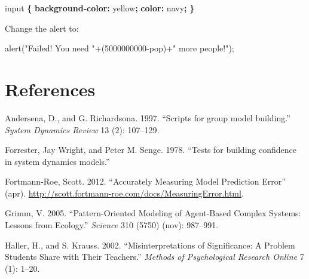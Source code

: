 \documentclass[]{memoir}
\newenvironment{Shaded}{}{}
\newcommand{\KeywordTok}[1]{\textcolor[rgb]{0.00,0.44,0.13}{\textbf{{#1}}}}
\newcommand{\DataTypeTok}[1]{\textcolor[rgb]{0.56,0.13,0.00}{{#1}}}
\newcommand{\DecValTok}[1]{\textcolor[rgb]{0.25,0.63,0.44}{{#1}}}
\newcommand{\StringTok}[1]{\textcolor[rgb]{0.25,0.44,0.63}{{#1}}}
\newcommand{\FunctionTok}[1]{\textcolor[rgb]{0.02,0.16,0.49}{{#1}}}
\newcommand{\NormalTok}[1]{{#1}}
\begin{document}

\begin{Shaded}
\begin{Highlighting}[]
\NormalTok{input }\KeywordTok{\{}
    \KeywordTok{background-color:} \DataTypeTok{yellow}\KeywordTok{;}
    \KeywordTok{color:} \DataTypeTok{navy}\KeywordTok{;}
\KeywordTok{\}}
\end{Highlighting}
\end{Shaded}


Change the alert to:

\begin{Shaded}
\begin{Highlighting}[]
\FunctionTok{alert}\NormalTok{(}\StringTok{"Failed! You need "}\NormalTok{+(}\DecValTok{5000000000}\NormalTok{-pop)+}\StringTok{" more people!"}\NormalTok{);}
\end{Highlighting}
\end{Shaded}

\chapter{References}

Andersena, D., and G. Richardsona. 1997. ``Scripts for group model
building.'' \emph{System Dynamics Review} 13 (2): 107--129.

Forrester, Jay Wright, and Peter M. Senge. 1978. ``Tests for building
confidence in system dynamics models.''

Fortmann-Roe, Scott. 2012. ``Accurately Measuring Model Prediction
Error'' (apr).
\url{http://scott.fortmann-roe.com/docs/MeasuringError.html}.

Grimm, V. 2005. ``Pattern-Oriented Modeling of Agent-Based Complex
Systems: Lessons from Ecology.'' \emph{Science} 310 (5750) (nov):
987--991.

Haller, H., and S. Krauss. 2002. ``Misinterpretations of Significance: A
Problem Students Share with Their Teachers.'' \emph{Methods of
Psychological Research Online} 7 (1): 1--20.
\end{document}
